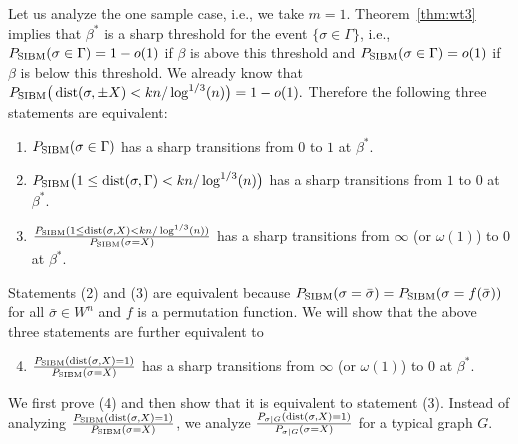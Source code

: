\documentclass{article}
\begin{document}
Let us analyze the one sample case, i.e., we take $m=1$.
Theorem~\ref{thm:wt3} implies that $\beta^\ast$ is a sharp threshold for the event $\{\sigma \in \Gamma\}$, i.e., $P_{\operatorname{SIBM}}(\sigma\in \Gamma)=1-o(1)$ if $\beta$ is above this threshold and $P_{\operatorname{SIBM}}(\sigma\in \Gamma)=o(1)$ if $\beta$ is below this threshold.
We already know that
$
P_{\operatorname{SIBM}} \big(\operatorname{dist}(\sigma,\pm X)< kn/\log^{1/3}(n) \big) = 1- o(1) .
$
Therefore the following three statements are equivalent:
\begin{enumerate}[label=(\arabic*)]
\item $P_{\operatorname{SIBM}}(\sigma\in \Gamma)$ has a sharp transitions from $0$ to $1$ at $\beta^\ast$.
\item $P_{\operatorname{SIBM}} \big( 1\le \operatorname{dist}(\sigma,\Gamma)< kn/\log^{1/3}(n) \big)$ has a sharp transitions from $1$ to $0$ at $\beta^\ast$.
\item $\frac{P_{\operatorname{SIBM}} ( 1\le \operatorname{dist}(\sigma, X)< kn/\log^{1/3}(n) )}{P_{\operatorname{SIBM}}(\sigma= X)}$ has a sharp transitions from $\infty$ (or $\omega(1)$) to $0$ at $\beta^\ast$.
\end{enumerate}
Statements (2) and (3) are equivalent because $P_{\operatorname{SIBM}}(\sigma=\bar{\sigma})=P_{\operatorname{SIBM}}(\sigma=f(\bar{\sigma}))$ for all $\bar{\sigma}\in W^n$ and $f$ is a permutation function.
We will show that the above three statements are further equivalent to
\begin{enumerate}[label=(\arabic*)]
\setcounter{enumi}{3}
  \item  $\frac{P_{\operatorname{SIBM}} ( \operatorname{dist}(\sigma, X) = 1 )}{P_{\operatorname{SIBM}}(\sigma= X)}$ has a sharp transitions from $\infty$ (or $\omega(1)$) to $0$ at $\beta^\ast$.
\end{enumerate}
We first prove (4) and then show that it is equivalent to statement (3).
Instead of analyzing $\frac{P_{\operatorname{SIBM}} ( \operatorname{dist}(\sigma, X) = 1 )}{P_{\operatorname{SIBM}}(\sigma= X)}$, we analyze $\frac{P_{\sigma|G} ( \operatorname{dist}(\sigma, X) = 1 )}{P_{\sigma|G}(\sigma= X)}$ for a typical graph $G$.
\end{document}
